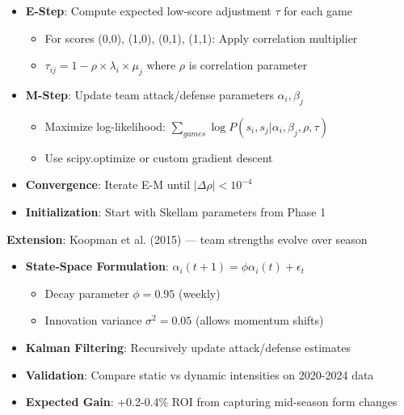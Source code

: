 \begin{itemize}
  \item {} \textbf{E-Step}: Compute expected low-score adjustment $\tau$ for each game
  \begin{itemize}
    \item For scores (0,0), (1,0), (0,1), (1,1): Apply correlation multiplier
    \item $\tau_{ij} = 1 - \rho \times \lambda_i \times \mu_j$ where $\rho$ is correlation parameter
  \end{itemize}
  \item {} \textbf{M-Step}: Update team attack/defense parameters $\alpha_i, \beta_j$
  \begin{itemize}
    \item Maximize log-likelihood: $\sum_{games} \log P(s_i, s_j | \alpha_i, \beta_j, \rho, \tau)$
    \item Use scipy.optimize or custom gradient descent
  \end{itemize}
  \item {} \textbf{Convergence}: Iterate E-M until $|\Delta \rho| < 10^{-4}$
  \item {} \textbf{Initialization}: Start with Skellam parameters from Phase 1
\end{itemize}

\textbf{Extension}: Koopman et al. (2015) — team strengths evolve over season

\begin{itemize}
  \item {} \textbf{State-Space Formulation}: $\alpha_i(t+1) = \phi \alpha_i(t) + \epsilon_t$
  \begin{itemize}
    \item Decay parameter $\phi = 0.95$ (weekly)
    \item Innovation variance $\sigma^2 = 0.05$ (allows momentum shifts)
  \end{itemize}
  \item {} \textbf{Kalman Filtering}: Recursively update attack/defense estimates
  \item {} \textbf{Validation}: Compare static vs dynamic intensities on 2020-2024 data
  \item \textbf{Expected Gain}: +0.2-0.4\% ROI from capturing mid-season form changes
\end{itemize}

